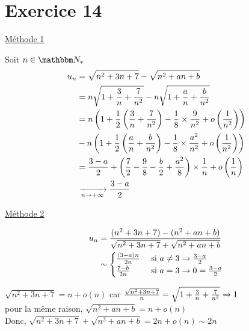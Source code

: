 \part{Exercice 14}

\begin{center}
	\underline{Méthode 1}
\end{center}

Soit $n\in \N_*$
\begin{align*}
	u_n &= \sqrt{n^2 + 3n + 7}  - \sqrt{n^2 + an + b} \\
	&= n\sqrt{1 + \frac{3}{n} + \frac{7}{n^2}} - n\sqrt{1 + \frac{a}{n} + \frac{b}{n^2}} \\
	&= n\left( 1+\frac{1}{2}\left( \frac{3}{n}+\frac{7}{n^2} \right) - \frac{1}{8}\times \frac{9}{n^2} + o\left( \frac{1}{n^2} \right)  \right) \\
	&- n\left( 1 + \frac{1}{2}\left( \frac{a}{n}+\frac{b}{n^2} \right) - \frac{1}{8} \times \frac{a^2}{n^2} +o\left( \frac{1}{n^2} \right) \right)  \\
	&= \frac{3-a}{2} + \left( \frac{7}{2} - \frac{9}{8} - \frac{b}{2}+\frac{a^2}{8} \right) \times \frac{1}{n} + o\left( \frac{1}{n} \right)  \\
	&\xrightarrow[n \to +\infty]{} \frac{3-a}{2}
\end{align*}

\begin{center}
	\underline{Méthode 2}
\end{center}

\begin{align*}
	u_n &= \frac{(n^2 + 3n + 7) - (n^2 + an + b)}{\sqrt{n^2 + 3n + 7} + \sqrt{n^2 + an + b}}\\
	&\sim \begin{cases}
		\frac{(3-a)n}{2n} &\text{ si } a \neq 3 \xrightarrow[]{} \frac{3-a}{2}\\
		\frac{7-b}{2n} &\text{ si } a = 3 \xrightarrow[]{} 0 = \frac{3-a}{2}
	\end{cases}
\end{align*}

$\sqrt{n^2 + 3n + 7} = n + o(n)$ car $\frac{\sqrt{n^2 + 3n + 7}}{n} = \sqrt{1 + \frac{3}{n} + \frac{7}{n^2}} \xrightarrow[]{} 1$ \\
pour la même raison, $\sqrt{n^2 + an + b}  = n + o(n)$ \\

Donc, $\sqrt{n^2 + 3n + 7} + \sqrt{n^2 + an + b} = 2n + o(n) \sim 2n$

